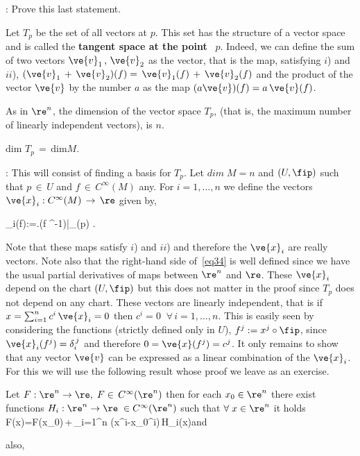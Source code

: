 \ejer: Prove this last statement.

\espa
Let $T_p$ be the set of all vectors at $p$. This set
has the structure of a vector space and is called the 
\textbf{tangent space at the point}~ $p$. 
Indeed, we can define the sum of two
vectors ${\ve{ v}}_1\,,\,{\ve{ v}}_2$ as the vector, that is the
map, satisfying $i$) and $ii$), $({\ve{ v}}_1\,+\,{\ve{v}}_2)(f)
=\,{\ve{ v}}_1(f)\,+\,{\ve{ v}}_2(f)$ 
and the product of the
vector ${\ve{ v}}$ by the number $a$ as the map $(a{\ve{
v}})(f)=a\,{\ve{ v}}(f)$.

As in $\re^n$, the dimension of the vector space $T_p$,
(that is, the maximum number of
linearly independent vectors), is $n$.

\bteo
dim $T_p\,=\, \mathrm{dim} M$.
\eteo

\pru: This will consist of finding a basis
for $T_p$. Let $dim\;M=n$ and $(U,\fip)$ such that $p\,\in\,U$ and
$f\,\in\,C^{\infty}(M)$  any. For $i=1,\ldots,n$ we define
the vectors $\ve{ x}_i:C^{\infty}(M)\,\to\,\re$ given by,

\beq
{}_i(f):=\left.(f\circ
\fip^{-1})\right|_{\fip(p)} . 
\label{eq34}
\eeq

Note that these maps satisfy $i$) and $ii$) and therefore the
$\ve{ x}_i$ are
really vectors. Note also that the right-hand side of~\ref{eq34}
is well defined since we have the usual partial derivatives
of maps between $\re^n$ and $\re$. These $\ve{ x}_i$ depend on the chart
$(U,\fip)$ but this does not matter in the proof since $T_p$ does not depend
on any chart. These vectors are linearly independent, that is if $x=\sum_{i=1}^n c^i\,\ve{ x}_i=0$ then $c^i=0\;\;\forall\,i=1,\ldots,n$. This
is easily seen by considering the functions (strictly defined
only in $U$), $f^j :=x^j\circ\fip$, since
$\ve{ x}_i(f^j)=\delta_i^{\,j}$ and therefore $0=\ve{x}(f^j)=c^j$. 
It only remains to show that any vector ${\ve{ v}}$ can be expressed as
a linear combination of the $\ve{ x}_i$. For this we will use the following
result whose proof we leave as an exercise. 

\blem
Let $F:\re^n\to\re, \; F\in\,C^{\infty}(\re^n)$ then for
each $x_0\in\re^n$ there exist functions
$H_i:\re^n\to\re\;\in C^{\infty}(\re^n) $ such that
$\forall\;x\in\re^n$ it holds 
\beq
F(x)=F(x_0)\,+\,\sum_{i=1}^n (x^i-x_0^i)\,H_i(x)\;\;\mbox{and}    \label{eq11}
\eeq
\par
\noi also,

\vskip -1cm

